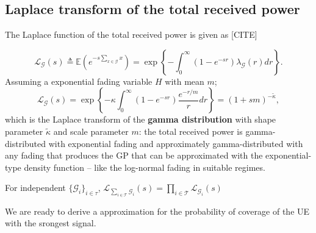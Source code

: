 \documentclass[conference]{IEEEtran}
\theoremstyle{definition}
\theoremstyle{plain}
\begin{document}
          \subsection{Laplace transform of the total received power}

          The Laplace function of the total received power is given as [CITE]

          \begin{equation}
            \label{eq:lapdef}
            \mathcal{L}_{\mathcal{G}}(s)\triangleq \mathbb{E}\left(e^{-s\sum\limits_{x \in \mathcal{G}}x}\right)= \exp\left\{-\int_0^{\infty}(1-e^{-sr}) \lambda_{\mathcal{G}}(r) dr \right\}.
          \end{equation}
          Assuming a exponential fading variable $H$ with mean $m$;
          \begin{equation}
            \label{eq:lapexp}
            \mathcal{L}_{\mathcal{G}}(s)= \exp\left\{-\mathcal{\kappa}\int_0^{\infty}(1-e^{-sr})\frac{e^{-r/m}}{r} dr \right\}=(1+sm)^{-\tilde{\kappa}},
          \end{equation}
          which is the Laplace transform of the \textbf{gamma distribution} with shape parameter $\tilde{\kappa}$ and scale parameter $m$: the total received power is gamma-distributed with exponential fading and approximately gamma-distributed with any fading that produces the GP that can be approximated with the exponential-type density function – like the log-normal fading in suitable regimes.
          
          For independent $\{\mathcal{G}_i\}_{i \in \mathcal{\tau}}$, $\mathcal{L}_{\sum_{i \in \mathcal{T}} \mathcal{G}_i}(s) = \prod_{i \in \mathcal{T}} \mathcal{L}_{\mathcal{G}_i}(s)$
          
          We are ready to derive a approximation for the probability of coverage of the UE with the srongest signal.
\end{document}
